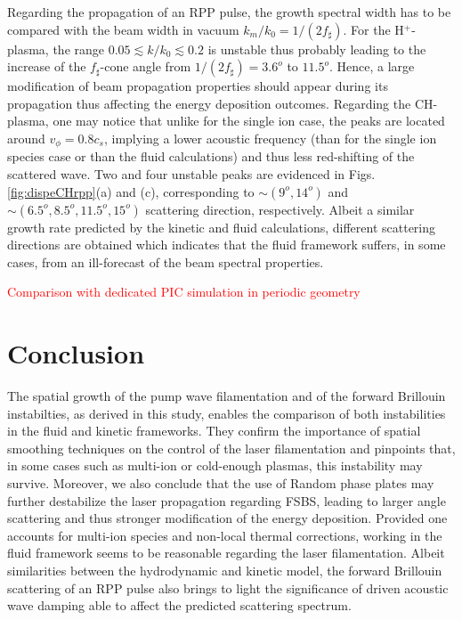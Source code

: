 \documentclass[
 reprint,
 amsmath,amssymb,
 aps,
]{revtex4-1}
\begin{document}
Regarding the propagation of an RPP pulse, the growth spectral width has to be compared with the  beam width in vacuum $k_m/k_0=1/(2f_\sharp)$. 
For the H$^+$-plasma, 
the range  $0.05 \lesssim k/k_0\lesssim 0.2$ 
is unstable thus probably 
leading to the increase of the $f_\sharp$-cone 
angle from $1/(2f_\sharp)=3.6^o$ to $11.5^o$. 
Hence, a large modification of beam 
propagation properties  should appear during its propagation thus affecting the energy deposition outcomes.
Regarding the CH-plasma, one may notice that unlike for the single ion case, the peaks are located around $v_\phi=0.8c_s$, implying a lower acoustic frequency (than for the single ion species case or than the fluid calculations) and thus less red-shifting of the scattered wave.
Two and four unstable peaks are evidenced in Figs. \ref{fig:dispeCHrpp}(a) and (c), corresponding to $\sim (9^o,14^o)$ and $ \sim (6.5^o,8.5^o,11.5^o,15^o)$ scattering direction, respectively.
Albeit  a similar growth rate  predicted by the kinetic and fluid calculations, different scattering directions are obtained which indicates that the fluid framework  suffers, in some cases, from an ill-forecast of the beam spectral properties. 

\textcolor{red}{Comparison with dedicated PIC simulation in periodic geometry}


\section{Conclusion}
The spatial growth of the  pump wave filamentation and of the forward Brillouin instabilties, as derived in this study, enables the comparison of both instabilities in the fluid and kinetic frameworks. They confirm the importance  of spatial smoothing techniques on the control of the laser filamentation and pinpoints that, in some cases such as multi-ion  or cold-enough  plasmas, this instability may survive.
Moreover, we also conclude that the use of Random phase plates may further destabilize the laser propagation   regarding FSBS,  leading to larger angle scattering and thus stronger modification of the energy deposition.
Provided one accounts for multi-ion species and non-local thermal corrections, working in the fluid framework seems to be reasonable regarding the laser filamentation. 
Albeit similarities between the hydrodynamic and kinetic model, the forward Brillouin scattering of an RPP pulse also brings to light the significance of    driven acoustic  wave damping able to  affect  the predicted  scattering spectrum.
\end{document}
